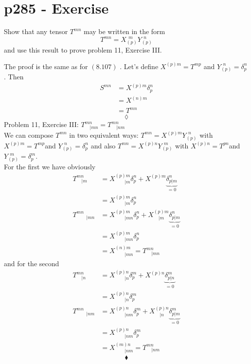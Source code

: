 \section{p285 - Exercise}
\begin{tcolorbox}
Show that any tensor $T^{mn}$ may be written in the form
$$T^{mn}=X_{(p)}^{\ \ m}Y_{(p)}^{\ \ n}$$
and use this result to prove problem 11, Exercise III.
\end{tcolorbox}
The proof is the same as for $\mathbf{(8.107)}$ . Let's define $X^{(p) m}_{}=T^{mp}$ and $Y^{\ \ n}_{(p)}= \delta^n_p$. Then 
\begin{align}
S^{mn}&= X^{(p) m}_{} \delta^n_p\\
 &= X^{(n) m}_{}\\
 &=T^{mn}
\end{align}
$$\lozenge$$
Problem 11, Exercise III: $ T^{mn}_{\quad | mn}= T^{mn}_{\quad | nm}$\\
We can compose $T^{mn}$ in two equivalent ways:   $T^{mn} = X^{(p) m}_{}Y^{\ \ n}_{(p)}$ with $X^{(p) m}_{}=T^{mp}$and $Y^{\ \ n}_{(p)}= \delta^n_p$ and also $T^{mn} = X^{(p) n}_{}Y^{\ \ m}_{(p)}$ with $X^{(p) n}_{}=T^{pn}$and $Y^{\ \ m}_{(p)}= \delta^m_p$. \\
For the first we have obviously
\begin{align}
T^{mn}_{\quad | m}&= X^{(p) m}_{\quad \quad |m} \delta^n_p+ X^{(p) m}_{} \underbrace{\delta^n_{p|m}}_{=0}\\
&= X^{(p) m}_{\quad \quad | m} \delta^n_p\\
T^{mn}_{\quad \quad | mn}&= X^{(p) m}_{\quad \quad |mn} \delta^n_p+ X^{(p) m}_{\quad |m} \underbrace{\delta^n_{p|m}}_{=0}\\
&= X^{(p) m}_{\quad \quad |mn} \delta^n_p\\
&= X^{(n) m}_{\quad \quad |mn} 
= T^{mn}_{\quad | mn}
\end{align}
and for the second 
\begin{align}
T^{mn}_{\quad | n}&= X^{(p) n}_{\quad \quad |n} \delta^m_p+ X^{(p) n}_{} \underbrace{\delta^m_{p|n}}_{=0}\\
&= X^{(p) n}_{\quad \quad | n} \delta^m_p\\
T^{mn}_{\quad \quad | nm}&= X^{(p) n}_{\quad \quad |nm} \delta^m_p+ X^{(p) n}_{\quad |n} \underbrace{\delta^m_{p|m}}_{=0}\\
&= X^{(p) n}_{\quad \quad |nm} \delta^m_p\\
&= X^{(m) n}_{\quad \quad |nm} = T^{mn}_{\quad | nm}
\end{align}
$$\blacklozenge$$
\newpage


